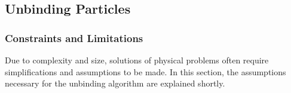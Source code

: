 



























\subsection{Unbinding Particles}



\subsubsection{Constraints and Limitations}








Due to complexity and size, solutions of physical problems often require simplifications and assumptions to be made.
In this section, the assumptions necessary for the unbinding algorithm are explained shortly.


